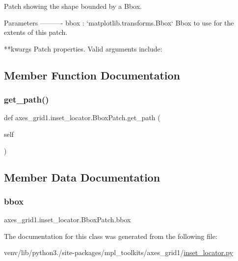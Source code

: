 \begin{DoxyVerb}Patch showing the shape bounded by a Bbox.

Parameters
----------
bbox : `matplotlib.transforms.Bbox`
    Bbox to use for the extents of this patch.

**kwargs
    Patch properties. Valid arguments include:

\end{DoxyVerb}
 

\subsection{Member Function Documentation}
\mbox{\label{classaxes__grid1_1_1inset__locator_1_1BboxPatch_a0773878ca7c0e4dedb4ff14130e902ca}} 
\subsubsection{\texorpdfstring{get\+\_\+path()}{get\_path()}}
{\footnotesize\ttfamily def axes\+\_\+grid1.\+inset\+\_\+locator.\+Bbox\+Patch.\+get\+\_\+path (\begin{DoxyParamCaption}\item[{}]{self }\end{DoxyParamCaption})}



\subsection{Member Data Documentation}
\mbox{\label{classaxes__grid1_1_1inset__locator_1_1BboxPatch_ae24a675e881d5c9de328275f349aa68a}} 
\subsubsection{\texorpdfstring{bbox}{bbox}}
{\footnotesize\ttfamily axes\+\_\+grid1.\+inset\+\_\+locator.\+Bbox\+Patch.\+bbox}



The documentation for this class was generated from the following file\+:\begin{DoxyCompactItemize}
\item 
venv/lib/python3./site-\/packages/mpl\+\_\+toolkits/axes\+\_\+grid1/\hyperlink{_2inset__locator_8py}{inset\+\_\+locator.\+py}\end{DoxyCompactItemize}
